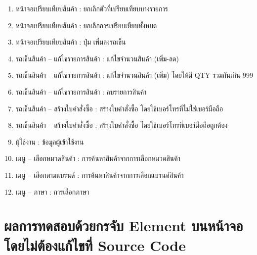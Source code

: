 \begin{enumerate}
        \item หน้าจอเปรียบเทียบสินค้า : ยกเลิกตัวที่เปรียบเทียบบางรายการ
        \item หน้าจอเปรียบเทียบสินค้า : ยกเลิกการเปรียบเทียบทั้งหมด
        \item หน้าจอเปรียบเทียบสินค้า : ปุ่ม เพิ่มลงรถเข็น
        \item รถเข็นสินค้า – แก้ไขรายการสินค้า : แก้ไขจำนวนสินค้า (เพิ่ม-ลด)
        \item รถเข็นสินค้า – แก้ไขรายการสินค้า : แก้ไขจำนวนสินค้า (เพิ่ม) โดยให้มี QTY รวมกันเกิน 999
        \item รถเข็นสินค้า – แก้ไขรายการสินค้า : ลบรายการสินค้า
        \item รถเข็นสินค้า – สร้างใบคำสั่งซื้อ : สร้างใบคำสั่งซื้อ โดยใช้เบอร์โทรที่ไม่ใช่เบอร์มือถือ
        \item รถเข็นสินค้า – สร้างใบคำสั่งซื้อ : สร้างใบคำสั่งซื้อ โดยใช้เบอร์โทรที่เบอร์มือถือถูกต้อง
        \item ผู้ใช้งาน : ข้อมูลผู้เข้าใช้งาน
        \item เมนู – เลือกหมวดสินค้า : การค้นหาสินค้าจากการเลือกหมวดสินค้า
        \item เมนู – เลือกตามแบรนด์ : การค้นหาสินค้าจากการเลือกแบรนด์สินค้า
        \item เมนู – ภาษา : การเลือกภาษา
    \end{enumerate}

\newpage
\section{ผลการทดสอบด้วยกรจับ Element บนหน้าจอโดยไม่ต้องแก้ไขที่ Source Code}

